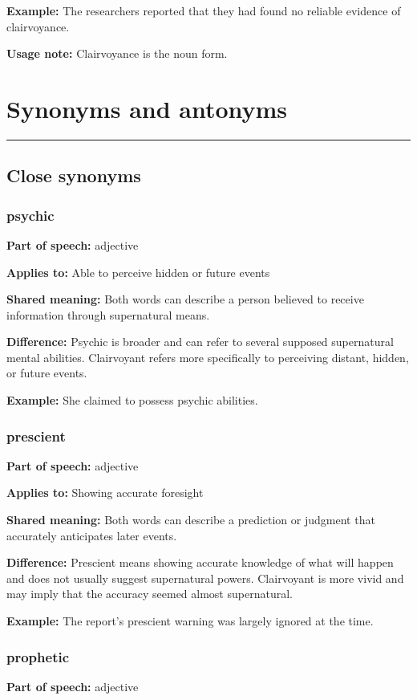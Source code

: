 \documentclass[11pt]{article}
\newcommand{\sectionrule}{\par\vspace{-0.5em}\noindent\textcolor{Accent}{\rule{\linewidth}{0.6pt}}\par}
\begin{document}
\textbf{Example:} The researchers reported that they had found no reliable evidence of clairvoyance.

\textbf{Usage note:} Clairvoyance is the noun form.

\section{Synonyms and antonyms}
\sectionrule
\subsection{Close synonyms}
\subsubsection{psychic}
\textbf{Part of speech:} adjective

\textbf{Applies to:} Able to perceive hidden or future events

\textbf{Shared meaning:} Both words can describe a person believed to receive information through supernatural means.

\textbf{Difference:} Psychic is broader and can refer to several supposed supernatural mental abilities. Clairvoyant refers more specifically to perceiving distant, hidden, or future events.

\textbf{Example:} She claimed to possess psychic abilities.

\subsubsection{prescient}
\textbf{Part of speech:} adjective

\textbf{Applies to:} Showing accurate foresight

\textbf{Shared meaning:} Both words can describe a prediction or judgment that accurately anticipates later events.

\textbf{Difference:} Prescient means showing accurate knowledge of what will happen and does not usually suggest supernatural powers. Clairvoyant is more vivid and may imply that the accuracy seemed almost supernatural.

\textbf{Example:} The report's prescient warning was largely ignored at the time.

\subsubsection{prophetic}
\textbf{Part of speech:} adjective
\end{document}
